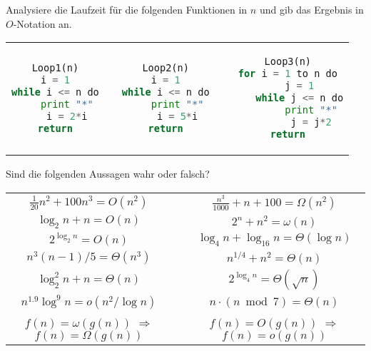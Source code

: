 \documentclass{uebung_cs}
\begin{document}
\begin{aufgabe}
	Analysiere die Laufzeit für die folgenden Funktionen in $n$ und gib das Ergebnis in $O$-Notation an.
	\begin{center}
		\begin{tabular}{ccccc}

\begin{lstlisting}[language=Python]
Loop1(n)
i = 1
while i <= n do
	print "*"
	i = 2*i
return
\end{lstlisting}		
		
			&\mbox{}\hspace{2cm}\mbox{}&

\begin{lstlisting}[language=Python]
Loop2(n)
i = 1
while i <= n do
	print "*"
	i = 5*i
return
\end{lstlisting}

			
			&\mbox{}\hspace{2cm}\mbox{}&
			
\begin{lstlisting}[language=Python]
Loop3(n)
for i = 1 to n do
	j = 1
	while j <= n do
		print "*"
		j = j*2
return
\end{lstlisting}
		\end{tabular}
	\end{center}
\end{aufgabe}

\begin{aufgabe}
	Sind die folgenden Aussagen wahr oder falsch?
	\begin{center}
		\begin{tabular}{ccc}
			$\frac{1}{20}n^2 + 100 n^3 = O(n^2)$
			&\mbox{}\hspace{2cm}\mbox{}&
			$\frac{n^3}{1000} + n + 100 = \Omega(n^2)$\\
			$\log_2 n + n = O(n)$&&
			$2^n + n^2 = \omega(n)$\\
			$2^{\log_2 n} = O(n)$&&
			$\log_4 n + \log_{16} n = \Theta(\log n)$\\
			$n^3(n-1)/5 = \Theta(n^3)$&&
			$n^{1/4} + n^2 = \Theta(n)$\\
			$\log_2^2n + n = \Theta(n)$&&
			$2^{\log_4n} = \Theta(\sqrt{n})$\\
			$n^{1.9}\log^9 n = o(n^2/\log n)$&&
			$n\cdot(n\bmod 7) = \Theta(n)$\\
			$f(n)=\omega(g(n))$
			$\Longrightarrow$
			$f(n)=\Omega(g(n))$&&
			$f(n)=O(g(n))$
			$\Longrightarrow$
			$f(n)=o(g(n))$
		\end{tabular}
	\end{center}
\end{aufgabe}
\end{document}
